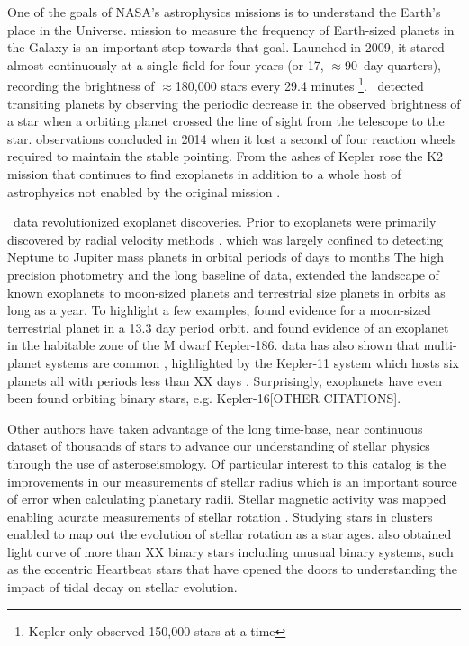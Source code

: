 
One of the goals of NASA's astrophysics missions is to understand the Earth's place in the Universe.  mission to measure the frequency of Earth-sized planets in the Galaxy is an important step towards that goal. Launched in 2009, it stared almost continuously at a single field for four years (or 17, $\approx$90~day quarters), recording the brightness of $\approx$180,000 stars every 29.4 minutes \footnote{Kepler only observed 150,000 stars at a time}. \Kepler\ detected transiting planets by observing the periodic decrease in the observed brightness of a star when a orbiting planet crossed the line of sight from the telescope to the star.  observations concluded in 2014 when it lost a second of four reaction wheels required to maintain the stable pointing.  From the ashes of Kepler rose the K2 mission  that continues to find exoplanets in addition to a whole host of astrophysics not enabled by the original \Kepler{} mission \citep{Howell2014}.


\Kepler\ data revolutionized exoplanet discoveries. Prior to \Kepler{,} exoplanets were primarily discovered by radial velocity methods \citep[e.g.][]{Queloz95}, which was largely confined to detecting Neptune to Jupiter mass planets in orbital periods of days to months The high precision photometry and the long baseline of  \Kepler{} data, extended the landscape of known exoplanets to moon-sized planets and terrestrial size planets in orbits as long as a year. To highlight a few examples, \citep{Barclay2013} found evidence for a moon-sized terrestrial planet in a 13.3 day period orbit. and \citep{Quintana2014} found evidence of an exoplanet in the habitable zone of the M dwarf Kepler-186. \Kepler data has also shown that multi-planet systems are common , highlighted by the Kepler-11 system which hosts six planets all with periods less than XX days \citep[XX][]{Lissauer2011}. Surprisingly,  exoplanets have even been found orbiting binary stars, e.g. Kepler-16\citep{Doyle2011}[OTHER CITATIONS].

Other authors have taken advantage of the long time-base, near continuous dataset of thousands of stars to advance our understanding of stellar physics through the use of asteroseismology. Of particular interest to this catalog is the improvements in our measurements of stellar radius \citep[e.g.][]{Huber14?} which is an important source of error when calculating planetary radii. Stellar magnetic activity was mapped enabling acurate measurements of stellar rotation \citep[e.g.][]{ThatgirlinOxford}. Studying stars in clusters enabled \citet{Meibom??} to map out the evolution of stellar rotation as a star ages. \Kepler{} also obtained light curve of more than XX binary stars \citep{Prsa2011,Kirk2016} including unusual binary systems, such as the eccentric Heartbeat stars \citet{Welsh2011,Thompson2012} that have opened the doors to understanding the impact of tidal decay on stellar evolution.


